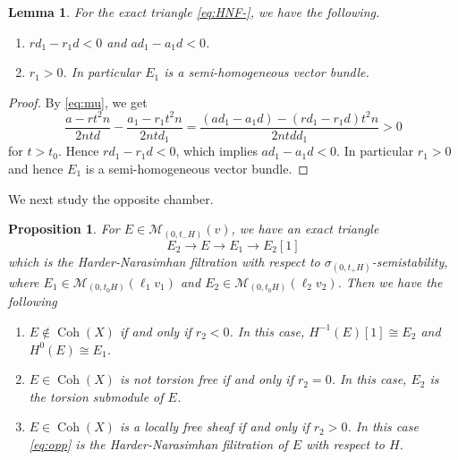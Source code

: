 \documentclass[10pt]{amsart}
\def\cal{\mathcal}
\newenvironment{NB}{
\color{red}{\bf NB}. \footnotesize 
}{}
\newcommand{\Coh}{\operatorname{Coh}}
\numberwithin{equation}{section}
\theoremstyle{plain}
\newtheorem{lem}[thm]{Lemma}
\newtheorem{prop}[thm]{Proposition}
\theoremstyle{definition}
\theoremstyle{remark}
\begin{document}



\begin{lem}\label{lem:d_1}
For the exact triangle \eqref{eq:HNF-}, we have the following.
\begin{enumerate}
\item[(1)]
$rd_1-r_1 d<0$ and $ad_1-a_1 d<0$.
\item[(2)]
$r_1>0$. In particular $E_1$ is a semi-homogeneous vector bundle.
\end{enumerate}
\end{lem}

\begin{proof}
By \eqref{eq:mu}, we get   
$$
\frac{a-rt^2 n}{2ntd}-\frac{a_1-r_1 t^2 n}{2ntd_1}
=\frac{(ad_1-a_1 d)-(rd_1-r_1 d)t^2 n}{2nt dd_1}>0
$$
for $t>t_0$.
Hence $rd_1-r_1 d<0$, which implies $ad_1-a_1 d<0$.
In particular $r_1>0$ and hence $E_1$ is a semi-homogeneous vector bundle.
\end{proof}

We next study the opposite chamber.
\begin{prop}\label{prop:opp}
For $E \in {\cal M}_{(0,t_- H)}(v)$, we have an exact triangle 
\begin{equation}\label{eq:opp}
E_2 \to E \to E_1 \to E_2[1]
\end{equation}
which is the Harder-Narasimhan filtration with respect to $\sigma_{(0,t_+ H)}$-semistability, where
$E_1 \in {\cal M}_{(0,t_0 H)}(\ell_1 v_1)$ and
$E_2 \in {\cal M}_{(0,t_0 H)}(\ell_2 v_2)$.
Then we have the following
\begin{enumerate}
\item
$E \not \in \Coh(X)$ if and only if $r_2<0$.   
In this case, $H^{-1}(E)[1] \cong E_2$ and $H^0(E) \cong E_1$.
\item
$E \in \Coh(X)$ is not torsion free if and only if $r_2=0$.
In this case, $E_2$ is the torsion submodule of $E$.
\item
$E \in \Coh(X)$ is a locally free sheaf if and only if $r_2>0$.
In this case
\eqref{eq:opp} is the Harder-Narasimhan filitration of $E$
with respect to
$H$.
\end{enumerate}
\end{prop}
\end{document}
